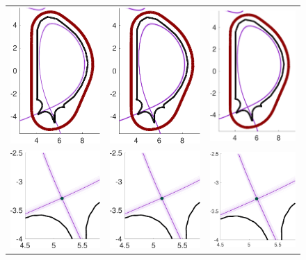 \begin{figure}[ht!]\centering
\begin{tabular}{ccc}
\includegraphics[width=0.19\linewidth]{./figures/QoI_MC_uniform.pdf}
&\includegraphics[width=0.19\linewidth]{./figures/QoI_MLMC_DirectSolver_Interp2CommonGrid.pdf} 
& \includegraphics[width=0.19\linewidth]{./figures/QoI_MFMC.pdf} 
\\
\includegraphics[width=0.19\linewidth]{./figures/QoI_MC_uniform_xptRegion.pdf} 
&\includegraphics[width=0.19\linewidth]{./figures/QoI_MLMC_DirectSolver_xptRegion_Interp2CommonGrid.pdf} 
&\includegraphics[width=0.19\linewidth]{./figures/QoI_MFMC_xptRegion.pdf} 

\end{tabular}
\end{figure}
